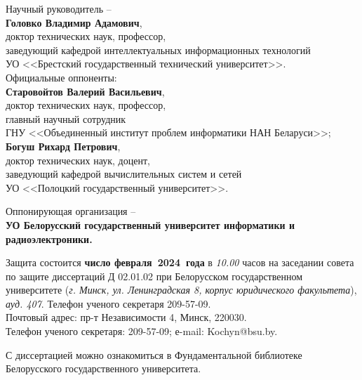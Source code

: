 \documentclass{thesisby}
\begin{document}
\noindent \hangindent=53mm
     Научный руководитель -- \\ {\bf Головко Владимир Адамович},\\ доктор технических наук, профессор,\\ заведующий кафедрой интеллектуальных информационных технологий\\ УО <<Брестский государственный технический университет>>.\\
            
\vspace*{\fill} \noindent \hangindent=53mm
    Официальные оппоненты:\\ {\bf Старовойтов Валерий Васильевич},\\ доктор технических наук, профессор,\\ главный научный сотрудник\\ ГНУ <<Объединенный институт проблем информатики НАН Беларуси>>; %
    \\ [5pt]
    {\bf Богуш Рихард Петрович},\\ доктор технических наук, доцент,\\ заведующий кафедрой вычислительных систем и сетей\\ УО <<Полоцкий государственный университет>>.

\vspace*{\fill} \noindent \hangindent=53mm Оппонирующая
организация -- \\ \textbf{УО Белорусский государственный университет информатики и радиоэлектроники.}

\vspace*{\fill} \noindent Защита состоится \textbf{число февраля~2024~года} в \textit{10.00} часов на заседании совета по защите диссертаций Д 02.01.02 при Белорусском государственном университете (\textit{г. Минск, ул. Ленинградская 8, корпус юридического факультета}), \textit{ауд. 407}. Телефон ученого секретаря 209-57-09.\\
Почтовый адрес: пр-т Независимости 4, Минск, 220030.\\
Телефон ученого секретаря: 209-57-09; е-mail: Kochyn@bsu.by.

\vspace*{\fill} \noindent
С диссертацией можно ознакомиться в Фундаментальной библиотеке\\ Белорусского государственного университета.
\end{document}
